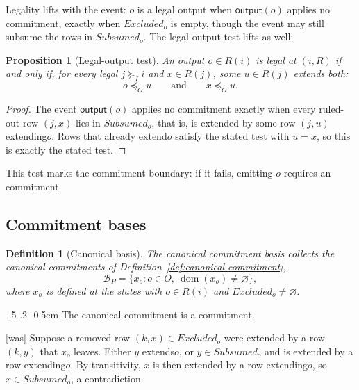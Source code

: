 \documentclass[sigconf]{cidr-2027}
\makeatletter
\newtheorem{proposition}{Proposition}
\newtheorem{definition}{Definition}
\theoremstyle{remark}
\renewcommand\paragraph{\@startsection{paragraph}{4}{\z@}%
  {-.5\baselineskip \@plus -2\p@ \@minus -.2\p@}%
  {-0.5em}%
  {\normalfont\bfseries}}
\newcommand{\OutputOrd}{\preceq_O}
\newcommand{\InputGe}{\succeq_I}
\newcommand{\commitment}{commitment\xspace}
\newcommand{\commitments}{commitments\xspace}
\newcommand{\Commitment}{Commitment\xspace}
\newcommand{\outrel}{extends\xspace}          %
\newcommand{\outrelbase}{extend\xspace}       %
\newcommand{\outrelpart}{extending\xspace}    %
\newcommand{\outrelpast}{extended\xspace}     %
\newcommand{\Subsumed}{\mathit{Subsumed}}
\newcommand{\Excluded}{\mathit{Excluded}}
\makeatother
\begin{document}
Legality lifts with the event: $o$ is a legal output when $\mathsf{output}(o)$
applies no \commitment, exactly when $\Excluded_o$ is empty, though the event may
still subsume the rows in $\Subsumed_o$.  The legal-output test lifts as well:

\begin{proposition}[Legal-output test]
\label{prop:exposability}
An output $o\in R(i)$ is legal at $(i,R)$ if and only if, for every legal
$j\InputGe i$ and $x\in R(j)$, some $u\in R(j)$ \outrel both:
\begin{equation}
  o\OutputOrd u
  \qquad\text{and}\qquad
  x\OutputOrd u.
  \label{eq:safe-exposure}
\end{equation}
\end{proposition}

\begin{proof}
The event $\mathsf{output}(o)$ applies no \commitment exactly when every
ruled-out row $(j,x)$ lies in $\Subsumed_o$, that is, is \outrelpast by some row
$(j,u)$ \outrelpart $o$.  Rows that already \outrelbase $o$ satisfy the stated
test with $u=x$, so this is exactly the stated test.
\end{proof}

This test marks the \commitment boundary: if it fails, emitting $o$ requires an
\commitment.

\subsection{\Commitment bases}
\label{app:commitment-bases}

\begin{definition}[Canonical basis]
\label{def:canonical-commitment-basis}
The \emph{canonical \commitment basis} collects the canonical \commitments of
Definition~\ref{def:canonical-commitment},
\begin{equation}
  \mathcal B_P
    =\{x_o:o\in O,\ \operatorname{dom}(x_o)\neq\varnothing\},
  \label{eq:canonical-commitment-basis-relational}
\end{equation}
where $x_o$ is defined at the states with $o\in R(i)$ and $\Excluded_o\neq\varnothing$.
\end{definition}

\paragraph{The canonical \commitment is a \commitment.}


{\footnotesize\color{black!50}\noindent\textsf{[was]} Suppose a removed row $(k,x)\in\Excluded_o$ were \outrelpast by a row $(k,y)$
that $x_o$ leaves.  Either $y$ \outrel $o$, or $y\in\Subsumed_o$ and is
\outrelpast by a row \outrelpart $o$.  By transitivity, $x$ is then
\outrelpast by a row \outrelpart $o$, so $x\in\Subsumed_o$, a contradiction.\par}
\end{document}
